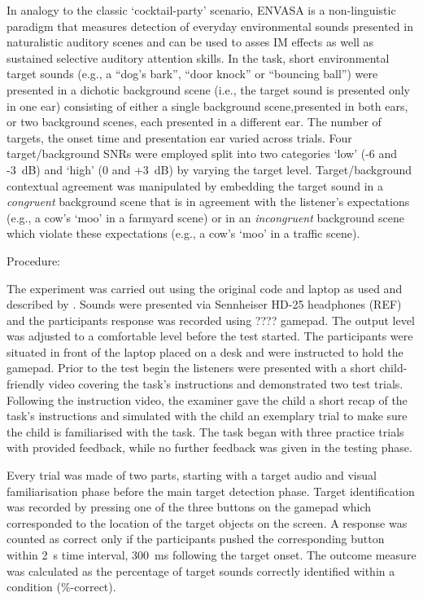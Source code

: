 \documentclass[a4paper, twoside]{templates/ociamthesis}
\begin{document}
In analogy to the classic `cocktail-party' scenario, ENVASA is a non-linguistic paradigm \autocite{Leech2009} that measures detection of everyday environmental sounds presented in naturalistic auditory scenes and can be used to asses IM effects as well as sustained selective auditory attention skills. In the task, short environmental target sounds (e.g., a ``dog's bark'', ``door knock'' or ``bouncing ball'') were presented in a dichotic background scene (i.e., the target sound is presented only in one ear) consisting of either a single background scene,presented in both ears, or two background scenes, each presented in a different ear. The number of targets, the onset time and presentation ear varied across trials. Four target/background SNRs were employed split into two categories `low' (-6 and -3~dB) and `high' (0 and +3~dB) by varying the target level. Target/background contextual agreement was manipulated by embedding the target sound in a \emph{congruent} background scene that is in agreement with the listener's expectations (e.g., a cow's `moo' in a farmyard scene) or in an \emph{incongruent} background scene which violate these expectations (e.g., a cow's `moo' in a traffic scene).

Procedure:

The experiment was carried out using the original code and laptop as used and described by \textcite{Leech2009}. Sounds were presented via Sennheiser HD-25 headphones (REF) and the participants response was recorded using ???? gamepad. The output level was adjusted to a comfortable level before the test started. The participants were situated in front of the laptop placed on a desk and were instructed to hold the gamepad. Prior to the test begin the listeners were presented with a short child-friendly video covering the task's instructions and demonstrated two test trials. Following the instruction video, the examiner gave the child a short recap of the task's instructions and simulated with the child an exemplary trial to make sure the child is familiarised with the task. The task began with three practice trials with provided feedback, while no further feedback was given in the testing phase.

Every trial was made of two parts, starting with a target audio and visual familiarisation phase before the main target detection phase. Target identification was recorded by pressing one of the three buttons on the gamepad which corresponded to the location of the target objects on the screen. A response was counted as correct only if the participants pushed the corresponding button within 2~s time interval, 300~ms following the target onset. The outcome measure was calculated as the percentage of target sounds correctly identified within a condition (\%-correct).
\end{document}
